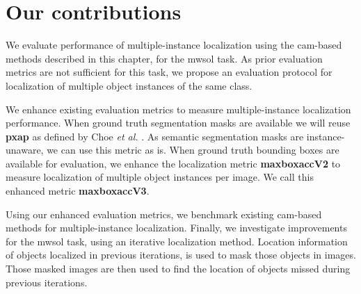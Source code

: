 \section{Our contributions}
We evaluate performance of multiple-instance localization using the \acrshort{cam}-based methods described in this chapter, for the \acrshort{mwsol} task. As prior evaluation metrics are not sufficient for this task, we propose an evaluation protocol for localization of multiple object instances of the same class. 

We enhance existing evaluation metrics \cite{choe2020evaluating} to measure multiple-instance localization performance. When ground truth segmentation masks are available we will reuse \textbf{\acrshort{pxap}} as defined by Choe \textit{et al.} \cite{choe2020evaluating}. As semantic segmentation masks are instance-unaware, we can use this metric as is. When ground truth bounding boxes are available for evaluation, we enhance the localization metric \textbf{\acrshort{maxboxacc}V2} to measure localization of multiple object instances per image. We call this enhanced metric \textbf{\acrshort{maxboxacc}V3}. 

Using our enhanced evaluation metrics, we benchmark existing \acrshort{cam}-based methods for multiple-instance localization. Finally, we investigate improvements for the \acrshort{mwsol} task, using an iterative localization method. Location information of objects localized in previous iterations, is used to mask those objects in images. Those masked images are then used to find the location of objects missed during previous iterations.